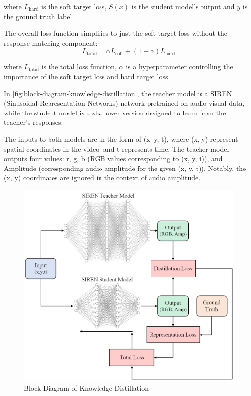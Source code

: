 \documentclass{ioereport}
\begin{document}
    where $L_{\text{hard}}$ is the soft target loss, $S(x)$ is the student model's output and $y$ is the ground truth label.

    The overall loss function simplifies to just the soft target loss without the response matching component:
    \begin{equation}
        L_{\text{total}} = \alpha L_{\text{soft}} + (1 - \alpha) L_{\text{hard}}
    \end{equation}

    where  $L_{\text{total}}$ is the total loss function, $\alpha$ is a hyperparameter controlling the importance of the soft target loss and hard target loss.
    
    In \autoref{fig:block-diagram-knowledge-distillation}, the teacher model is a SIREN (Sinusoidal Representation Networks) network pretrained on audio-visual data, while the student model is a shallower version designed to learn from the teacher's responses.
    
    The inputs to both models are in the form of (x, y, t), where (x, y) represent spatial coordinates in the video, and t represents time. The teacher model outputs four values: r, g, b (RGB values corresponding to (x, y, t)), and Amplitude (corresponding audio amplitude for the given (x, y, t)). Notably, the (x, y) coordinates are ignored in the context of audio amplitude.
    
    \begin{figure}[H]
        \centering
        \includegraphics[width=0.95\linewidth]{assets/Knowledge Distillation.png}
        \caption{Block Diagram of Knowledge Distillation}
        \label{fig:block-diagram-knowledge-distillation}
    \end{figure}
\end{document}
